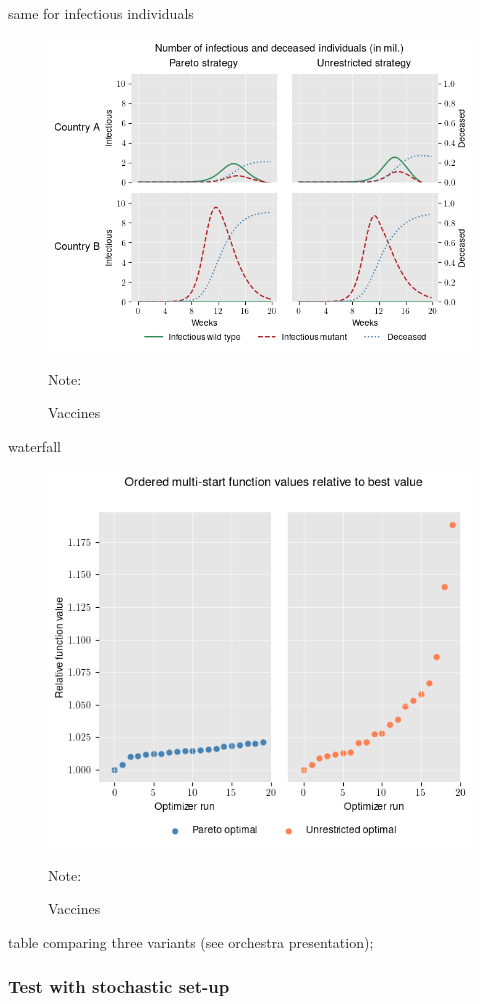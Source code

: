 same for infectious individuals
\begin{figure}[h!]
\centering
\includegraphics[scale=0.8]{images/splines_infectious_dead.png}\\
\begin{flushleft}
\scriptsize{Note:}
\end{flushleft}
\caption{Vaccines}
\label{fig:results_splines_infectious_dead}
\end{figure}


waterfall
\begin{figure}[h!]
\centering
\includegraphics[scale=0.6]{images/splines_waterfall.png}\\
\begin{flushleft}
\scriptsize{Note:}
\end{flushleft}
\caption{Vaccines}
\label{fig:results_splines_waterfall}
\end{figure}

table comparing three variants (see orchestra presentation);

\subsubsection{Test with stochastic set-up}









